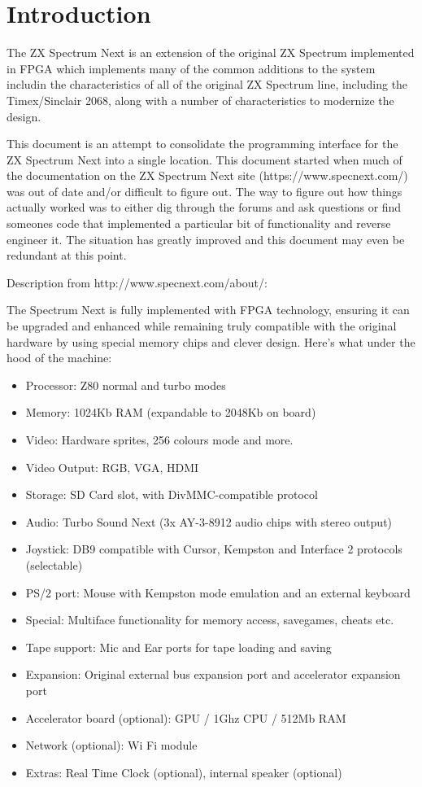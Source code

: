 \chapter{Introduction}
The ZX Spectrum Next is an extension of the original ZX Spectrum
implemented in FPGA which implements many of the common additions to
the system includin the characteristics of all of the original ZX
Spectrum line, including the Timex/Sinclair 2068, along with a number
of characteristics to modernize the design.

This document is an attempt to consolidate the programming interface
for the ZX Spectrum Next into a single location. This document started
when much of the documentation on the ZX Spectrum Next site
(https://www.specnext.com/) was out of date and/or difficult to figure
out. The way to figure out how things actually worked was to either
dig through the forums and ask questions or find someones code that
implemented a particular bit of functionality and reverse engineer
it. The situation has greatly improved and this document may even be
redundant at this point.

Description from http://www.specnext.com/about/:

The Spectrum Next is fully implemented with FPGA technology, ensuring
it can be upgraded and enhanced while remaining truly compatible with
the original hardware by using special memory chips and clever
design. Here’s what under the hood of the machine:

\begin{itemize}
\item Processor: Z80 normal and turbo modes
\item Memory: 1024Kb RAM (expandable to 2048Kb on board)
\item Video: Hardware sprites, 256 colours mode and more.
\item Video Output: RGB, VGA, HDMI
\item Storage: SD Card slot, with DivMMC-compatible protocol
\item Audio: Turbo Sound Next (3x AY-3-8912 audio chips with stereo
  output)
\item Joystick: DB9 compatible with Cursor, Kempston and Interface 2
  protocols (selectable)
\item PS/2 port: Mouse with Kempston mode emulation and an external keyboard
\item Special: Multiface functionality for memory access, savegames,
  cheats etc.
\item Tape support: Mic and Ear ports for tape loading and saving
\item Expansion: Original external bus expansion port and accelerator
  expansion port
\item Accelerator board (optional): GPU / 1Ghz CPU / 512Mb RAM
\item Network (optional): Wi Fi module
\item Extras: Real Time Clock (optional), internal speaker (optional)
\end{itemize}

